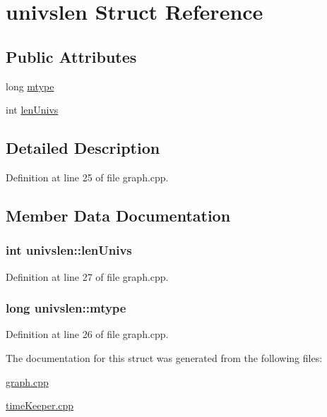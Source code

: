 \hypertarget{structunivslen}{\section{univslen \-Struct \-Reference}
\label{structunivslen}
}
\subsection*{\-Public \-Attributes}
\begin{DoxyCompactItemize}
\item 
long \hyperlink{structunivslen_a2b3bdfcfbc4d0468e7c5914d70b3d3fa}{mtype}
\item 
int \hyperlink{structunivslen_af66813054e135fa4cb89fd816558282c}{len\-Univs}
\end{DoxyCompactItemize}


\subsection{\-Detailed \-Description}


\-Definition at line 25 of file graph.\-cpp.



\subsection{\-Member \-Data \-Documentation}
\hypertarget{structunivslen_af66813054e135fa4cb89fd816558282c}{
\subsubsection[{len\-Univs}]{\setlength{\rightskip}{0pt plus 5cm}int {\bf univslen\-::len\-Univs}}}\label{structunivslen_af66813054e135fa4cb89fd816558282c}


\-Definition at line 27 of file graph.\-cpp.

\hypertarget{structunivslen_a2b3bdfcfbc4d0468e7c5914d70b3d3fa}{
\subsubsection[{mtype}]{\setlength{\rightskip}{0pt plus 5cm}long {\bf univslen\-::mtype}}}\label{structunivslen_a2b3bdfcfbc4d0468e7c5914d70b3d3fa}


\-Definition at line 26 of file graph.\-cpp.



\-The documentation for this struct was generated from the following files\-:\begin{DoxyCompactItemize}
\item 
\hyperlink{graph_8cpp}{graph.\-cpp}\item 
\hyperlink{timeKeeper_8cpp}{time\-Keeper.\-cpp}\end{DoxyCompactItemize}
